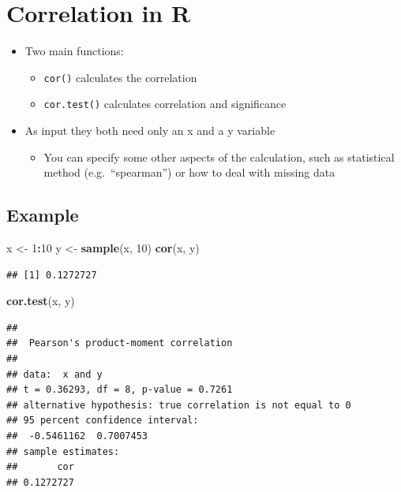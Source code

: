 \documentclass[
]{book}
\newenvironment{Shaded}{\begin{snugshade}}{\end{snugshade}}
\newcommand{\DecValTok}[1]{\textcolor[rgb]{0.00,0.00,0.81}{#1}}
\newcommand{\FunctionTok}[1]{\textcolor[rgb]{0.13,0.29,0.53}{\textbf{#1}}}
\newcommand{\NormalTok}[1]{#1}
\newcommand{\OtherTok}[1]{\textcolor[rgb]{0.56,0.35,0.01}{#1}}
\newcommand{\SpecialCharTok}[1]{\textcolor[rgb]{0.81,0.36,0.00}{\textbf{#1}}}
\providecommand{\tightlist}{%
  \setlength{\itemsep}{0pt}\setlength{\parskip}{0pt}}
\begin{document}
\section{Correlation in R}\label{correlation-in-r}

\begin{itemize}
\tightlist
\item
  Two main functions:

  \begin{itemize}
  \tightlist
  \item
    \texttt{cor()} calculates the correlation
  \item
    \texttt{cor.test()} calculates correlation and significance
  \end{itemize}
\item
  As input they both need only an x and a y variable

  \begin{itemize}
  \tightlist
  \item
    You can specify some other aspects of the calculation, such as statistical method (e.g.~``spearman'') or how to deal with missing data
  \end{itemize}
\end{itemize}

\subsection{Example}\label{example-2}

\begin{Shaded}
\begin{Highlighting}[]
\NormalTok{x }\OtherTok{\textless{}{-}} \DecValTok{1}\SpecialCharTok{:}\DecValTok{10} 
\NormalTok{y }\OtherTok{\textless{}{-}} \FunctionTok{sample}\NormalTok{(x, }\DecValTok{10}\NormalTok{)}
\FunctionTok{cor}\NormalTok{(x, y)}
\end{Highlighting}
\end{Shaded}

\begin{verbatim}
## [1] 0.1272727
\end{verbatim}

\begin{Shaded}
\begin{Highlighting}[]
\FunctionTok{cor.test}\NormalTok{(x, y)}
\end{Highlighting}
\end{Shaded}

\begin{verbatim}
## 
##  Pearson's product-moment correlation
## 
## data:  x and y
## t = 0.36293, df = 8, p-value = 0.7261
## alternative hypothesis: true correlation is not equal to 0
## 95 percent confidence interval:
##  -0.5461162  0.7007453
## sample estimates:
##       cor 
## 0.1272727
\end{verbatim}
\end{document}
